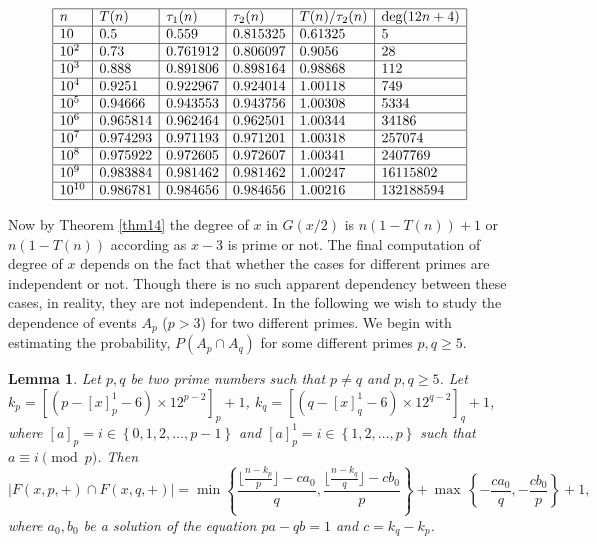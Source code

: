 \documentclass[11pt]{article}
\newtheorem{lemma}[theorem]{Lemma}
\theoremstyle{definition}
\theoremstyle{remark}
\numberwithin{equation}{section}
\newcommand{\set}[1]{\left\{#1\right\}}
\newcommand{\Mod}[3]{#1\equiv #2 \pmod{#3}}
\begin{document}
\begin{table}[t]
$$\begin{array}{|l|l|l|l|l|l|}
\hline
n & T(n) & \tau_1(n) & \tau_2(n) & T(n)/\tau_2(n) & \text{deg}(12n+4)\\
\hline 
10 &  0.5 & 0.559 & 0.815325 &  0.61325 & 5\\
\hline
10^2 & 0.73 & 0.761912 & 0.806097 &  0.9056 & 28\\
\hline
10^3 & 0.888 & 0.891806 & 0.898164 &  0.98868 & 112\\
\hline
10^4 & 0.9251 & 0.922967 & 0.924014 & 1.00118 & 749 \\
\hline
10^5 & 0.94666 & 0.943553 & 0.943756 &  1.00308 & 5334\\
\hline
10^6 & 0.965814 & 0.962464 & 0.962501 &  1.00344 & 34186\\
\hline
10^7 & 0.974293 & 0.971193 & 0.971201 &  1.00318 & 257074\\
\hline 
10^8 & 0.975922 & 0.972605 & 0.972607 &  1.00341 & 2407769\\
\hline
10^9 & 0.983884 & 0.981462 & 0.981462 &  1.00247 & 16115802\\
\hline
10^{10} & 0.986781 & 0.984656 & 0.984656 &  1.00216 & 132188594\\
\hline
\end{array}$$
\caption{Exact degrees of $x$ in $G(x/2)$ and comparison between values of $T(n)$ and $\tau_1(n),\tau_2(n)$ for $x=12n+4$.}\label{tabtnetan}
\end{table}

\vspace{1em}
\noindent
Now by Theorem \ref{thm14} the degree of $x$ in $G(x/2)$ is $n(1-T(n))+1$ or $n(1-T(n))$ according as $x-3$ is prime or not. The final computation of degree of $x$ depends on the fact that whether the cases for different primes are independent or not. Though there is no such apparent dependency between these cases, in reality, they are not independent. In the following we wish to study the dependence of events $A_p$ ($p>3$) for two different primes. We begin with estimating the probability, $P(A_p\cap A_q)$ for some different primes $p,q\geq 5$.

\begin{lemma}\label{lemindfp}
Let $p,q$ be two prime numbers such that $p\neq q$ and $p,q\geq 5$. Let $k_p=[(p-[x]_p^1-6)\times 12^{p-2}]_p+1$, $k_q=[(q-[x]_q^1-6)\times 12^{q-2}]_q+1$, where $[a]_p=i\in\set{0,1,2,\ldots,p-1}$ and $[a]_p^1=i\in\set{1,2,\ldots,p}$ such that $\Mod{a}{i}{p}$. Then 
$$|F(x,p,+)\cap F(x,q,+)|= \min\left\{\frac{\lfloor \frac{n-k_p}{p}\rfloor -ca_0}{q}, \frac{\lfloor \frac{n-k_q}{q}\rfloor -cb_0}{p}\right\} + \max\, \left\{-\frac{ca_0}{q},-\frac{cb_0}{p}\right\} +1,$$
where $a_0,b_0$ be a solution of the equation $pa-qb=1$ and $c=k_q-k_p$.
\end{lemma}
\end{document}
